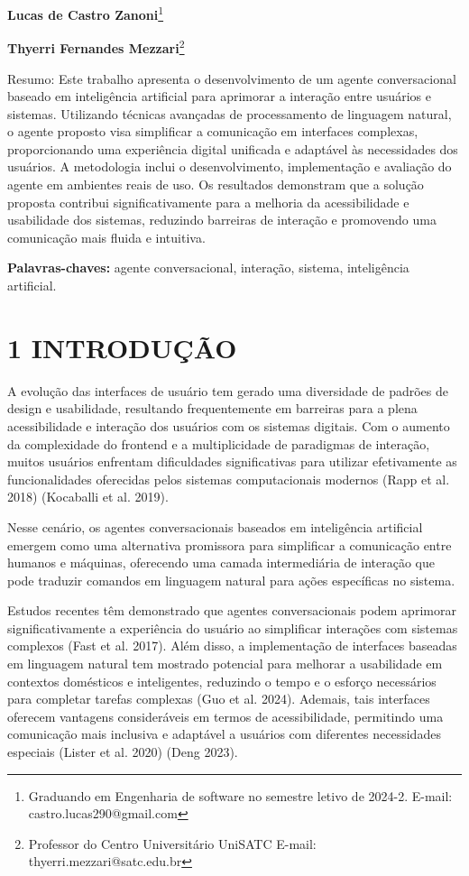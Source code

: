 \documentclass[
]{article}
\begin{document}
\textbf{Lucas de Castro Zanoni}\footnote{Graduando em Engenharia de
  software no semestre letivo de 2024-2. E-mail:
  castro.lucas290@gmail.com}

\textbf{Thyerri Fernandes Mezzari}\footnote{Professor do Centro
  Universitário UniSATC E-mail: thyerri.mezzari@satc.edu.br}

Resumo: Este trabalho apresenta o desenvolvimento de um agente
conversacional baseado em inteligência artificial para aprimorar a
interação entre usuários e sistemas. Utilizando técnicas avançadas de
processamento de linguagem natural, o agente proposto visa simplificar a
comunicação em interfaces complexas, proporcionando uma experiência
digital unificada e adaptável às necessidades dos usuários. A
metodologia inclui o desenvolvimento, implementação e avaliação do
agente em ambientes reais de uso. Os resultados demonstram que a solução
proposta contribui significativamente para a melhoria da acessibilidade
e usabilidade dos sistemas, reduzindo barreiras de interação e
promovendo uma comunicação mais fluida e intuitiva.

\textbf{Palavras-chaves:} agente conversacional, interação, sistema,
inteligência artificial.

\section{1 INTRODUÇÃO}\label{introduuxe7uxe3o}

A evolução das interfaces de usuário tem gerado uma diversidade de
padrões de design e usabilidade, resultando frequentemente em barreiras
para a plena acessibilidade e interação dos usuários com os sistemas
digitais. Com o aumento da complexidade do frontend e a multiplicidade
de paradigmas de interação, muitos usuários enfrentam dificuldades
significativas para utilizar efetivamente as funcionalidades oferecidas
pelos sistemas computacionais modernos (Rapp et al. 2018) (Kocaballi et
al. 2019).

Nesse cenário, os agentes conversacionais baseados em inteligência
artificial emergem como uma alternativa promissora para simplificar a
comunicação entre humanos e máquinas, oferecendo uma camada
intermediária de interação que pode traduzir comandos em linguagem
natural para ações específicas no sistema.

Estudos recentes têm demonstrado que agentes conversacionais podem
aprimorar significativamente a experiência do usuário ao simplificar
interações com sistemas complexos (Fast et al. 2017). Além disso, a
implementação de interfaces baseadas em linguagem natural tem mostrado
potencial para melhorar a usabilidade em contextos domésticos e
inteligentes, reduzindo o tempo e o esforço necessários para completar
tarefas complexas (Guo et al. 2024). Ademais, tais interfaces oferecem
vantagens consideráveis em termos de acessibilidade, permitindo uma
comunicação mais inclusiva e adaptável a usuários com diferentes
necessidades especiais (Lister et al. 2020) (Deng 2023).
\end{document}
